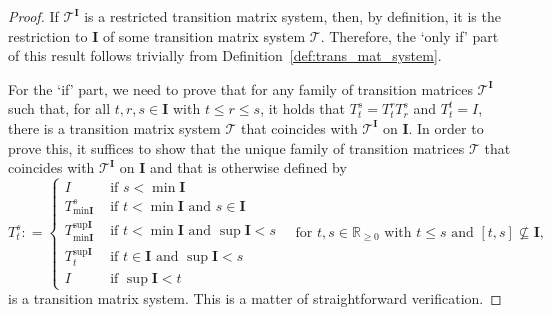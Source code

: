 \documentclass[10pt,a4paper]{paper}
\theoremstyle{definition}
\newcommand{\reals}{\mathbb{R}}
\newcommand{\realsnonneg}{\reals_{\geq 0}}
\newcommand{\coloneqq}{:\!=}
\begin{document}
\proprestrtransmatsystemifsemigroup*
\begin{proof}
If $\mathcal{T}^{\mathbf{I}}$ is a restricted transition matrix system, then, by definition, it is the restriction to $\mathbf{I}$ of some transition matrix system $\mathcal{T}$. Therefore, the `only if' part of this result follows trivially from Definition~\ref{def:trans_mat_system}.

For the `if' part, we need to prove that for any family of transition matrices $\mathcal{T}^{\mathbf{I}}$ such that, for all $t,r,s\in\mathbf{I}$ with $t\leq r\leq s$, it holds that $T_t^s = T_t^rT_r^s$ and $T_t^t=I$, there is a transition matrix system $\mathcal{T}$ that coincides with $\mathcal{T}^{\mathbf{I}}$ on $\mathbf{I}$. In order to prove this, it suffices to show that the unique family of transition matrices $\mathcal{T}$ that coincides with $\mathcal{T}^{\mathbf{I}}$ on $\mathbf{I}$ and that is otherwise defined by
\begin{equation}\label{eq:prop:restr_trans_mat_system_if_semigroup}
T_t^s
\coloneqq
\begin{cases}
I &\text{ if $s<\min \mathbf{I}$}\\
T_{\min\textbf{I}}^s &\text{ if $t<\min\textbf{I}$ and $s\in\textbf{I}$}\\
T_{\min\textbf{I}}^{\sup\textbf{I}} &\text{ if $t<\min\textbf{I}$ and $\sup\textbf{I}<s$}\\
T_t^{\sup\textbf{I}}
&\text{ if $t\in\textbf{I}$ and $\sup\textbf{I}<s$}\\
I &\text{ if $\sup\mathbf{I}<t$}
\end{cases}
~~~\text{ for $t,s\in\realsnonneg$ with $t\leq s$ and $[t,s]\not\subseteq\mathbf{I}$,}
\end{equation}
is a transition matrix system. This is a matter of straightforward verification.
\end{proof}
\end{document}
